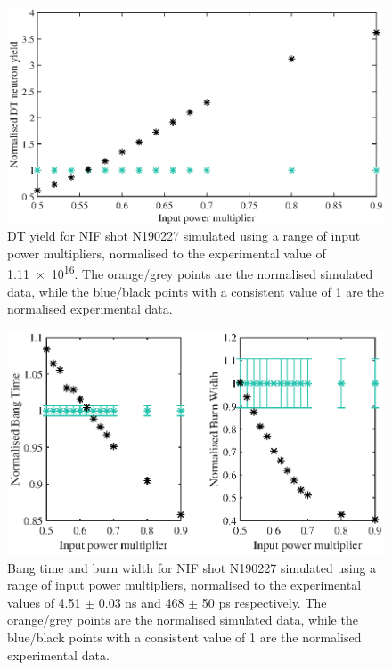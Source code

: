 \begin{figure}[ht]
\centering
\includegraphics{figures/LowCR/BenchmarkNifYield.eps}
\caption{DT yield for NIF shot N190227 simulated using a range of input power multipliers, normalised to the experimental value of \num{1.11e16}. The orange/grey points are the normalised simulated data, while the blue/black points with a consistent value of 1 are the normalised experimental data.}
\label{fig:NIFYield}
\end{figure}

\begin{figure}[ht]
\centering
\includegraphics{figures/LowCR/BenchmarkNifBangTime.eps}
\caption{Bang time and burn width for NIF shot N190227 simulated using a range of input power multipliers, normalised to the experimental values of 4.51 $\pm$ 0.03 ns and 468 $\pm$ 50 ps respectively. The orange/grey points are the normalised simulated data, while the blue/black points with a consistent value of 1 are the normalised experimental data.}
\label{fig:NIFBT}
\end{figure}

